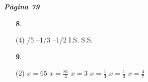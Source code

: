 \documentclass[a4paper, pdf, twoside]{book}
\begin{document}
\begin{multicols}{2}

{\textbf{\em Pàgina 79}} \hrulefill
\begin{enumerate}
\vspace{0.25cm}



 \item[\fontfamily{phv}\selectfont\color{blue}\textbf{8}. ]  \scalebox{0.6}{\simbolclau } 
 \begin{tasks}[column-sep=1em, item-indent=1.3333em](4)
	 /5
	 \task --1/3
	 \task --1/2
	 \task I.S.
	 \task S.S.
\end{tasks}
 \end{enumerate}
\begin{enumerate}
\vspace{0.25cm}



 \item[\fontfamily{phv}\selectfont\color{blue}\textbf{9}. ] 
 \begin{tasks}[column-sep=1em, item-indent=1.3333em](2)
	 \task $x=65$
	 \task $x=\frac {81}{4}$
	 \task $x=3$
	 \task $x=\frac {1}{3}$
	 \task $x=\frac {1}{3}$
	 \task $x=\frac {4}{7}$
\end{tasks}
 \end{enumerate}
\vspace{0.3cm}



\end{multicols}
\end{document}
